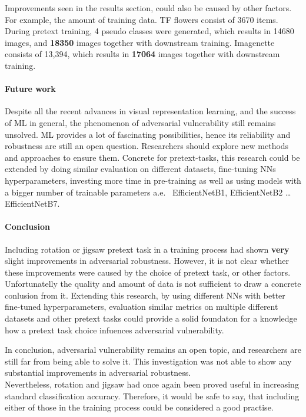 Improvements seen in the results section, could also be caused by other factors.
For example, the amount of training data.
TF flowers consist of 3670 items.
During pretext training, 4 pseudo classes were generated,
which results in 14680 images, and \textbf{18350} images together with downstream training.
Imagenette consists of 13,394, which results in \textbf{17064} images together with downstream training.

\paragraph{Future work}
Despite all the recent advances in visual representation learning, and the success of ML in general, the phenomenon of
adversarial vulnerability still remains unsolved.
ML provides a lot of fascinating possibilities, hence its reliability and robustness are still an open question.
Researchers should explore new methods and approaches to ensure them.
Concrete for pretext-tasks, this research could be extended by doing similar evaluation on different datasets,
fine-tuning NNs hyperparameters,
investing more time in pre-training as well as using models with a bigger number of trainable parameters
a.e. \ EfficientNetB1, EfficientNetB2 \ldots EfficientNetB7.

\paragraph{Conclusion}
Including rotation or jigsaw pretext task in a training process had shown \textbf{very} slight improvements in adversarial robustness.
However, it is not clear whether these improvements were caused by the choice of pretext task, or other factors.
Unfortunatelly the quality and amount of data is not sufficient to draw a concrete conlusion from it.
Extending this research, by using different NNs with better fine-tuned hyperparameters, evaluation similar metrics on
multiple different datasets and other pretext tasks could provide a solid foundaton for a knowledge how a pretext task choice
infuences adversarial vulnerability.


In conclusion, adversarial vulnerability remains an open topic,
and researchers are still far from being able to solve it.
This investigation was not able to show any substantial improvements in adversarial robustness.
\\
Nevertheless, rotation and jigsaw had once again been proved useful in increasing standard classification accuracy.
Therefore, it would be safe to say,
that including either of those in the training process could be considered a good practise.


